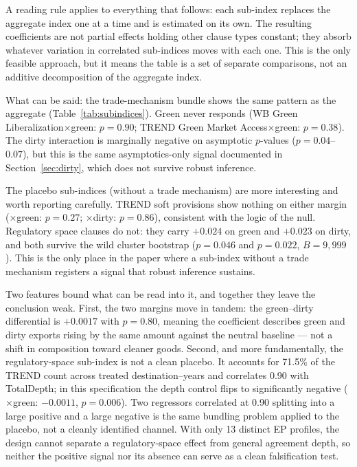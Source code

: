 \documentclass[12pt]{article}
\begin{document}
A reading rule applies to everything that follows: each sub-index replaces the aggregate
index one at a time and is estimated on its own. The resulting coefficients are not
partial effects holding other clause types constant; they absorb whatever variation in
correlated sub-indices moves with each one. This is the only feasible approach, but it
means the table is a set of separate comparisons, not an additive decomposition of the
aggregate index.

What can be said: the trade-mechanism bundle shows the same pattern as the aggregate
(Table~\ref{tab:subindices}).
Green never responds (WB Green Liberalization$\times$green: $p = 0.90$; TREND
Green Market Access$\times$green: $p = 0.38$). The dirty interaction is marginally
negative on asymptotic $p$-values ($p = 0.04$--$0.07$), but this is the same
asymptotics-only signal documented in Section~\ref{sec:dirty}, which does not survive
robust inference.

The placebo sub-indices (without a trade mechanism) are more interesting and worth
reporting carefully. TREND soft provisions show nothing on either margin ($\times$green:
$p = 0.27$; $\times$dirty: $p = 0.86$), consistent with the logic of the null. Regulatory
space clauses do not: they carry $+0.024$ on green and $+0.023$ on dirty, and both survive
the wild cluster bootstrap ($p = 0.046$ and $p = 0.022$, $B = 9{,}999$). This is the only
place in the paper where a sub-index without a trade mechanism registers a signal that
robust inference sustains.

Two features bound what can be read into it, and together they leave the conclusion weak.
First, the two margins move in tandem: the green--dirty differential is $+0.0017$ with
$p = 0.80$, meaning the coefficient describes green and dirty exports rising by the same
amount against the neutral baseline --- not a shift in composition toward cleaner goods.
Second, and more fundamentally, the regulatory-space sub-index is not a clean placebo.
It accounts for 71.5\% of the TREND count across treated destination--years and
correlates 0.90 with TotalDepth; in this specification the depth control flips to
significantly negative ($\times$green: $-0.0011$, $p = 0.006$). Two regressors correlated
at 0.90 splitting into a large positive and a large negative is the same bundling problem
applied to the placebo, not a cleanly identified channel. With only 13 distinct EP profiles, the design cannot separate a regulatory-space effect from general agreement depth, so neither the positive signal nor its absence can serve as a clean falsification test.
\end{document}
